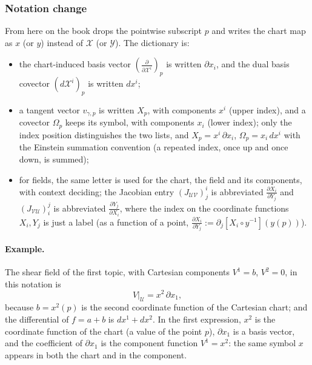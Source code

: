 \documentclass[11pt]{article}
\begin{document}
\subsubsection*{Notation change}
From here on the book drops the pointwise subscript $p$ and writes the chart map as $x$ (or $y$) instead of $\mathcal X$ (or $\mathcal Y$). The dictionary is:
\begin{itemize}
  \item the chart-induced basis vector $\left(\frac{\partial}{\partial\mathcal X^i}\right)_p$ is written $\partial x_i$, and the dual basis covector $(d\mathcal X^i)_p$ is written $dx^i$;
  \item a tangent vector $v_{\gamma,p}$ is written $X_p$, with components $x^i$ (upper index), and a covector $\Omega_p$ keeps its symbol, with components $x_i$ (lower index); only the index position distinguishes the two lists, and $X_p=x^i\,\partial x_i$, $\Omega_p=x_i\,dx^i$ with the Einstein summation convention (a repeated index, once up and once down, is summed);
  \item for fields, the same letter is used for the chart, the field and its components, with context deciding; the Jacobian entry $(J_{\mathcal{UV}})^i_j$ is abbreviated $\frac{\partial X_i}{\partial Y_j}$ and $(J_{\mathcal{VU}})^j_i$ is abbreviated $\frac{\partial Y_j}{\partial X_i}$, where the index on the coordinate functions $X_i,Y_j$ is just a label (as a function of a point, $\frac{\partial X_i}{\partial Y_j}:=\partial_j[X_i\circ y^{-1}](y(p))$).
\end{itemize}

\paragraph{Example.} The shear field of the first topic, with Cartesian components $V^1=b$, $V^2=0$, in this notation is
\[
V|_{\mathcal U}=x^2\,\partial x_1,
\]
because $b=x^2(p)$ is the second coordinate function of the Cartesian chart; and the differential of $f=a+b$ is $dx^1+dx^2$. In the first expression, $x^2$ is the coordinate function of the chart (a value of the point $p$), $\partial x_1$ is a basis vector, and the coefficient of $\partial x_1$ is the component function $V^1=x^2$: the same symbol $x$ appears in both the chart and in the component.
\end{document}
